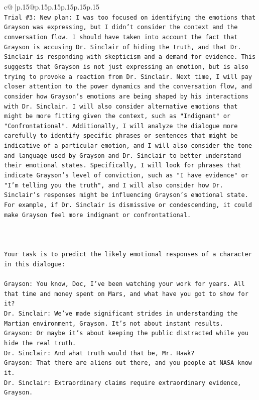 \documentclass{article}
\begin{document}
{\begin{supertabular}{c@{$\;$}|p{.15\linewidth}@{}p{.15\linewidth}p{.15\linewidth}p{.15\linewidth}p{.15\linewidth}p{.15\linewidth}}
{{{\\ 
\texttt{Trial \#3: New plan: I was too focused on identifying the emotions that Grayson was expressing, but I didn't consider the context and the conversation flow. I should have taken into account the fact that Grayson is accusing Dr. Sinclair of hiding the truth, and that Dr. Sinclair is responding with skepticism and a demand for evidence. This suggests that Grayson is not just expressing an emotion, but is also trying to provoke a reaction from Dr. Sinclair. Next time, I will pay closer attention to the power dynamics and the conversation flow, and consider how Grayson's emotions are being shaped by his interactions with Dr. Sinclair. I will also consider alternative emotions that might be more fitting given the context, such as "Indignant" or "Confrontational". Additionally, I will analyze the dialogue more carefully to identify specific phrases or sentences that might be indicative of a particular emotion, and I will also consider the tone and language used by Grayson and Dr. Sinclair to better understand their emotional states. Specifically, I will look for phrases that indicate Grayson's level of conviction, such as "I have evidence" or "I'm telling you the truth", and I will also consider how Dr. Sinclair's responses might be influencing Grayson's emotional state. For example, if Dr. Sinclair is dismissive or condescending, it could make Grayson feel more indignant or confrontational.} \\
\\ 
\\ 
\\ 
\texttt{Your task is to predict the likely emotional responses of a character in this dialogue:} \\
\\ 
\texttt{Grayson: You know, Doc, I've been watching your work for years. All that time and money spent on Mars, and what have you got to show for it? } \\
\texttt{Dr. Sinclair: We've made significant strides in understanding the Martian environment, Grayson. It's not about instant results. } \\
\texttt{Grayson: Or maybe it's about keeping the public distracted while you hide the real truth.} \\
\texttt{Dr. Sinclair: And what truth would that be, Mr. Hawk?} \\
\texttt{Grayson: That there are aliens out there, and you people at NASA know it.} \\
\texttt{Dr. Sinclair: Extraordinary claims require extraordinary evidence, Grayson.} \\
}}}
\end{supertabular}}
\end{document}
